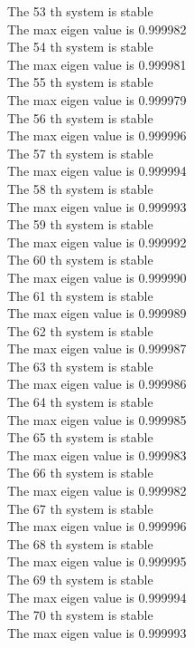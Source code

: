 \documentclass[11pt]{article}
\begin{document}
The 53 th system is stable \\
The max eigen value is 0.999982 \\
The 54 th system is stable \\
The max eigen value is 0.999981 \\
The 55 th system is stable \\
The max eigen value is 0.999979 \\
The 56 th system is stable \\
The max eigen value is 0.999996 \\
The 57 th system is stable \\
The max eigen value is 0.999994 \\
The 58 th system is stable \\
The max eigen value is 0.999993 \\
The 59 th system is stable \\
The max eigen value is 0.999992 \\
The 60 th system is stable \\
The max eigen value is 0.999990 \\
The 61 th system is stable \\
The max eigen value is 0.999989 \\
The 62 th system is stable \\
The max eigen value is 0.999987 \\
The 63 th system is stable \\
The max eigen value is 0.999986 \\
The 64 th system is stable \\
The max eigen value is 0.999985 \\
The 65 th system is stable \\
The max eigen value is 0.999983 \\
The 66 th system is stable \\
The max eigen value is 0.999982 \\
The 67 th system is stable \\
The max eigen value is 0.999996 \\
The 68 th system is stable \\
The max eigen value is 0.999995 \\
The 69 th system is stable \\
The max eigen value is 0.999994 \\
The 70 th system is stable \\
The max eigen value is 0.999993 \\
\end{document}
